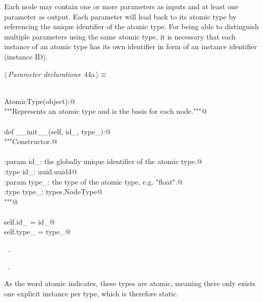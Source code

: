 \documentclass[
    a4paper,      %
    10pt,         %
    openright,    %
    notitlepage,  %
    parskip=half, %
]{scrreprt}       %
\theoremstyle{definition}                    %
\begin{document}
Each node may contain one or more parameters as inputs and at least one
parameter as output. Each parameter will lead back to its atomic type by
referencing the unique identifier of the atomic type. For being able to
distinguish multiple parameters using the same atomic type, it is necessary that
each instance of an atomic type has its own identifier in form of an instance
identifier (instance ID).

\begin{flushleft} \small
\begin{minipage}{\linewidth}\label{scrap55}\raggedright\small
{} $\langle\,${\itshape Parameter declarations}\nobreak\ {\footnotesize {44a}}$\,\rangle\equiv$
\vspace{-1exm}
\begin{list}{}{} \item
\mbox{}\lstinline@@\\
\mbox{}\lstinline@class AtomicType(object):@\\
\mbox{}\lstinline@    """Represents an atomic type and is the basis for each node."""@\\
\mbox{}\lstinline@@\\
\mbox{}\lstinline@    def __init__(self, id_, type_):@\\
\mbox{}\lstinline@        """Constructor.@\\
\mbox{}\lstinline@@\\
\mbox{}\lstinline@        :param id_: the globally unique identifier of the atomic type.@\\
\mbox{}\lstinline@        :type  id_: uuid.uuid4@\\
\mbox{}\lstinline@        :param type_: the type of the atomic type, e.g. "float".@\\
\mbox{}\lstinline@        :type  type_: types.NodeType@\\
\mbox{}\lstinline@        """@\\
\mbox{}\lstinline@@\\
\mbox{}\lstinline@        self.id_   = id_@\\
\mbox{}\lstinline@        self.type_ = type_@\\
\mbox{}\lstinline@@{\NWsep}
\end{list}
\vspace{-1.5ex}
\footnotesize
\begin{list}{}{\setlength{\itemsep}{-\parsep}\setlength{\itemindent}{-\leftmargin}}
\item \NWtxtMacroDefBy\ .
\item \NWtxtMacroRefIn\ .

\item{}
\end{list}
\end{minipage}\vspace{4ex}
\end{flushleft}
As the word atomic indicates, these types are atomic, meaning there only exists
one explicit instance per type, which is therefore static.
\end{document}
